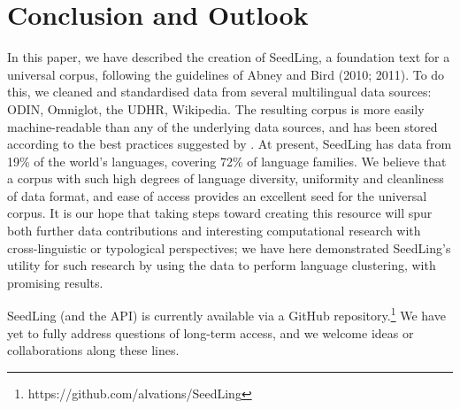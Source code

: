\section{Conclusion and Outlook} \label{sec:conclusion}

In this paper, we have described the creation of SeedLing, a foundation text for a universal corpus, following the guidelines of Abney and Bird (2010; 2011). To do this, we cleaned and standardised data from several multilingual data sources: ODIN, Omniglot, the UDHR, Wikipedia. The resulting corpus is more easily machine-readable than any of the underlying data sources, and has been stored according to the best practices suggested by . At present, SeedLing has data from 19\% of the world's languages, covering 72\% of language families. We believe that a corpus with such high degrees of language diversity, uniformity and cleanliness of data format, and ease of access provides an excellent seed for the universal corpus. It is our hope that taking steps toward creating this resource will spur both further data contributions and interesting computational research with cross-linguistic or typological perspectives; we have here demonstrated SeedLing's utility for such research by using the data to perform language clustering, with promising results.

SeedLing (and the API) is currently available via a GitHub repository.\footnote{https://github.com/alvations/SeedLing} We have yet to fully address questions of long-term access, and we welcome ideas or collaborations along these lines.

